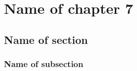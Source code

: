 

\graphicspath{{7/figures/}} %


\chapter{\label{ch7}Name of chapter 7} %

\section{\label{}Name of section}

\subsection{\label{}Name of subsection}




